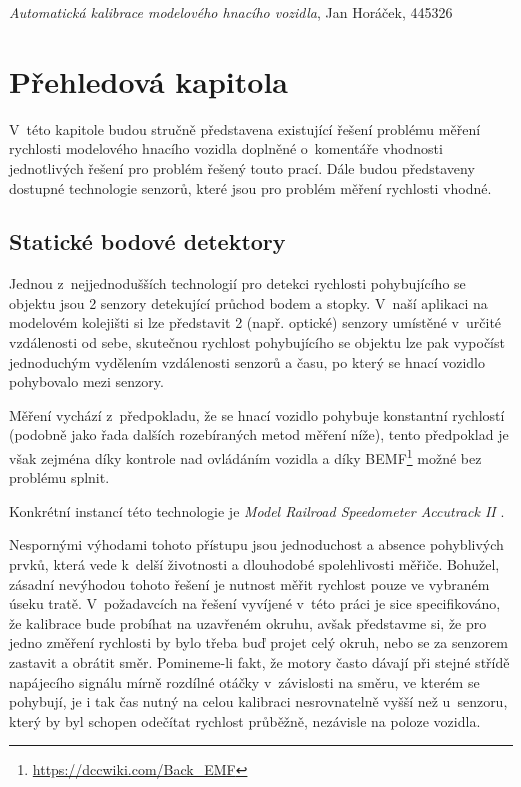 \documentclass[12pt,a4paper]{article}
\begin{document}
\pagestyle{empty}
\noindent

\textit{Automatická kalibrace modelového hnacího vozidla}, Jan Horáček, 445326

\section{Přehledová kapitola}

V~této kapitole budou stručně představena existující řešení problému měření
rychlosti modelového hnacího vozidla doplněné o~komentáře vhodnosti
jednotlivých řešení pro problém řešený touto prací. Dále budou představeny
dostupné technologie senzorů, které jsou pro problém měření rychlosti vhodné.

\subsection{Statické bodové detektory}

Jednou z~nejjednodušších technologií pro detekci rychlosti pohybujícího se
objektu jsou 2 senzory detekující průchod bodem
a stopky. V~naší aplikaci na modelovém kolejišti si lze představit 2
(např. optické) senzory umístěné v~určité vzdálenosti od sebe, skutečnou
rychlost pohybujícího se objektu lze pak vypočíst jednoduchým vydělením
vzdálenosti senzorů a času, po který se hnací vozidlo pohybovalo mezi senzory.

Měření vychází z~předpokladu, že se hnací vozidlo pohybuje konstantní
rychlostí (podobně jako řada dalších rozebíraných metod měření níže), tento
předpoklad je však zejména díky kontrole nad ovládáním vozidla a díky
BEMF\footnote{\url{https://dccwiki.com/Back\_EMF}}
možné bez problému splnit.

Konkrétní instancí této technologie je \textit{Model Railroad
Speedometer Accutrack II} \cite{accutrackII}.

Nespornými výhodami tohoto přístupu jsou jednoduchost a absence pohyblivých
prvků, která vede k~delší životnosti a dlouhodobé spolehlivosti měřiče.
Bohužel, zásadní nevýhodou tohoto řešení je nutnost měřit rychlost pouze ve
vybraném úseku tratě. V~požadavcích na řešení vyvíjené v~této práci je sice
specifikováno, že kalibrace bude probíhat na uzavřeném okruhu, avšak představme
si, že pro jedno změření rychlosti by bylo třeba buď projet celý okruh, nebo se
za senzorem zastavit a obrátit směr. Pomineme-li fakt, že motory často dávají
při stejné střídě napájecího signálu mírně rozdílné otáčky v~závislosti na
směru, ve kterém se pohybují, je i tak čas nutný na celou kalibraci
nesrovnatelně vyšší než u~senzoru, který by byl schopen odečítat rychlost
průběžně, nezávisle na poloze vozidla.
\end{document}
